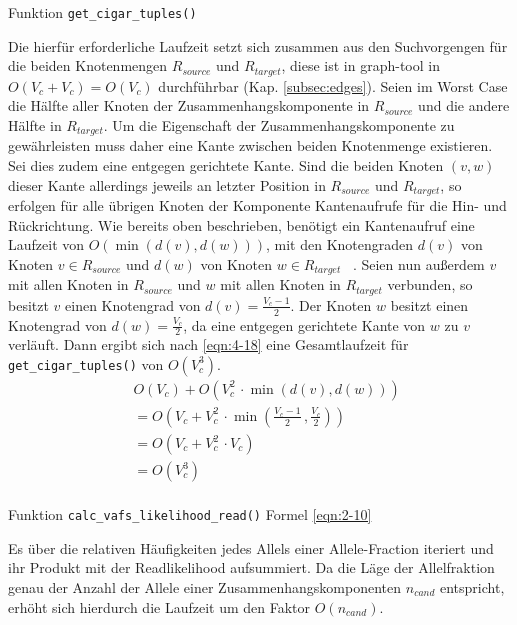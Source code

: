 Funktion \lstinline|get_cigar_tuples()|

Die hierfür erforderliche Laufzeit setzt sich zusammen aus den Suchvorgengen für die beiden Knotenmengen $ R_{source} $ und $ R_{target} $, diese ist in graph-tool in $O(V_{c} + V_{c}) = O(V_{c})$ durchführbar (Kap. \ref{subsec:edges}). Seien im Worst Case die Hälfte aller Knoten der Zusammenhangskomponente in $ R_{source} $ und die andere Hälfte in $ R_{target} $. Um die Eigenschaft der Zusammenhangskomponente zu gewährleisten muss daher eine Kante zwischen beiden Knotenmenge existieren. Sei dies zudem eine entgegen gerichtete Kante. Sind die beiden Knoten $ (v, w) $ dieser Kante allerdings jeweils an letzter Position in $ R_{source} $ und $ R_{target} $, so erfolgen für alle übrigen Knoten der Komponente Kantenaufrufe für die Hin- und Rückrichtung. Wie bereits oben beschrieben, benötigt ein Kantenaufruf eine Laufzeit von $ O(\min (d(v), d(w)))$, mit den Knotengraden $d(v) $ von Knoten $v \in R_{source}$ und $ d(w) $ von Knoten $ w \in R_{target} $ ~\cite{docs_graph_tool}. Seien nun außerdem $ v $ mit allen Knoten in $ R_{source} $ und $ w $ mit allen Knoten in $ R_{target} $ verbunden, so besitzt $v$ einen Knotengrad von $ d(v) = \frac{V_{c}-1}{2} $. Der Knoten $ w $ besitzt einen Knotengrad von $ d(w) = \frac{V_{c}}{2} $, da eine entgegen gerichtete Kante von $w$ zu $v$ verläuft. Dann ergibt sich nach \eqref{eqn:4-18} eine Gesamtlaufzeit für \lstinline|get_cigar_tuples()| von $ O(V_{c}^3) $. \\

\begin{equation} \label{eqn:4-18}
\tag{4-18}
\begin{aligned}
&\ {} O(V_{c}) + O(V_{c}^2 \, \cdotp \min (d(v), d(w)))  \\
& \ = O\left( V_{c} + V_{c}^2 \, \cdotp \min \left( \frac{V_{c}-1}{2}\,, \frac{V_{c}}{2}\right) \right) \\
&\ = O(V_{c} + V_{c}^2 \, \cdotp V_{c}) \\
&\ = O(V_{c}^3) \\
\end{aligned}
\end{equation}

Funktion \lstinline|calc_vafs_likelihood_read()| Formel \eqref{eqn:2-10} 

Es über die relativen Häufigkeiten jedes Allels einer Allele-Fraction iteriert und ihr Produkt mit der Readlikelihood aufsummiert. Da die Läge der Allelfraktion genau der Anzahl der Allele einer Zusammenhangskomponenten $ n_{cand} $ entspricht, erhöht sich hierdurch die Laufzeit um den Faktor $ O(n_{cand}) $.

